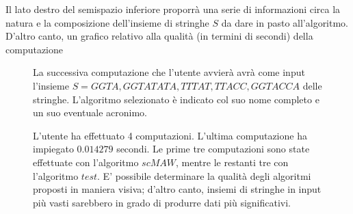\vspace{3mm}

Il lato destro del semispazio inferiore proporrà una serie di informazioni circa la natura e la composizione dell'insieme di stringhe $S$ da dare in pasto all'algoritmo. D'altro canto, un grafico relativo alla qualità (in termini di secondi) della computazione

\begin{figure}[ht!]
    \centering
    \caption{La successiva computazione che l'utente avvierà avrà come input l'insieme $S={GGTA, GGTATATA, TTTAT, TTACC, GGTACCA}$ delle stringhe. L'algoritmo selezionato è indicato col suo nome completo e un suo eventuale acronimo.}
    \label{fig:esempio}
\end{figure}

\begin{figure}[ht!]
    \centering
    \caption{L'utente ha effettuato 4 computazioni. L'ultima computazione ha impiegato $0.014279$ secondi. Le prime tre computazioni sono state effettuate con l'algoritmo $scMAW$, mentre le restanti tre con l'algoritmo $test$. E' possibile determinare la qualità degli algoritmi proposti in maniera visiva; d'altro canto, insiemi di stringhe in input più vasti sarebbero in grado di produrre dati più significativi.}
    \label{fig:esempio}
\end{figure}

